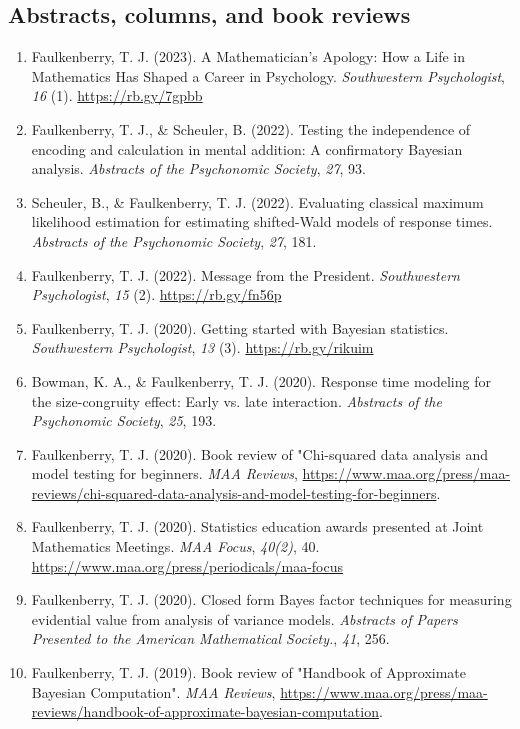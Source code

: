 \documentclass[article,10pt]{article}
\begin{document}
\subsection*{Abstracts, columns, and book reviews}
\label{sec:org76d0fcc}
\begin{enumerate}
\item Faulkenberry, T. J. (2023). A Mathematician's Apology: How a Life in Mathematics Has Shaped a Career in Psychology. \emph{Southwestern Psychologist}, \emph{16} (1). \url{https://rb.gy/7gpbb}
\item Faulkenberry, T. J., \& Scheuler, B. (2022). Testing the independence of encoding and calculation in mental addition: A confirmatory Bayesian analysis. \emph{Abstracts of the Psychonomic Society}, \emph{27}, 93.
\item Scheuler, B., \& Faulkenberry, T. J. (2022). Evaluating classical maximum likelihood estimation for estimating shifted-Wald models of response times. \emph{Abstracts of the Psychonomic Society}, \emph{27}, 181.
\item Faulkenberry, T. J. (2022). Message from the President. \emph{Southwestern Psychologist}, \emph{15} (2). \url{https://rb.gy/fn56p}
\item Faulkenberry, T. J. (2020). Getting started with Bayesian statistics. \emph{Southwestern Psychologist}, \emph{13} (3). \url{https://rb.gy/rikuim}
\item Bowman, K. A., \& Faulkenberry, T. J. (2020). Response time modeling for the size-congruity effect: Early vs. late interaction. \emph{Abstracts of the Psychonomic Society}, \emph{25}, 193.
\item Faulkenberry, T. J. (2020). Book review of "Chi-squared data analysis and model testing for beginners. \emph{MAA Reviews}, \url{https://www.maa.org/press/maa-reviews/chi-squared-data-analysis-and-model-testing-for-beginners}.
\item Faulkenberry, T. J. (2020). Statistics education awards presented at Joint Mathematics Meetings. \emph{MAA Focus}, \emph{40(2)}, 40. \url{https://www.maa.org/press/periodicals/maa-focus}
\item Faulkenberry, T. J. (2020). Closed form Bayes factor techniques for measuring evidential value from analysis of variance models. \emph{Abstracts of Papers Presented to the American Mathematical Society.}, \emph{41}, 256.
\item Faulkenberry, T. J. (2019). Book review of "Handbook of Approximate Bayesian Computation". \emph{MAA Reviews}, \url{https://www.maa.org/press/maa-reviews/handbook-of-approximate-bayesian-computation}.

\end{enumerate}
\end{document}
